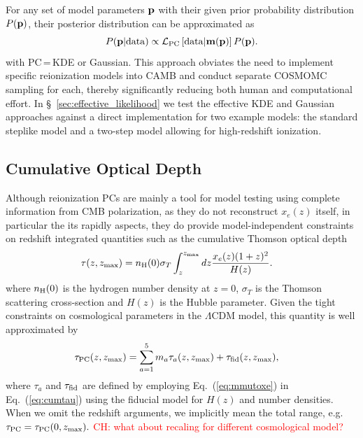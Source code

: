 \documentclass[prd,twocolumn,amsmath,amssymb,floatfix,superscriptaddress,nofootinbib]{revtex4-1}
\newcommand{\ch}[1]{\textcolor{red}{#1}}
\begin{document}
For any set of model parameters ${\bf p}$ with their given prior probability distribution
$P({\bf p})$, their posterior distribution can be approximated as 
\begin{equation}
P({\bf p}| {\rm data}) \propto {\cal L}_{\rm PC}\left[ {\rm data}|\mathbf{m}(\bf p) \right] P(\bf p).
\end{equation}
with PC\,=\,KDE or Gaussian.
This approach obviates the need to implement specific reionization models into CAMB and conduct separate COSMOMC sampling for each, thereby significantly reducing both human and computational effort.
In \S~\ref{sec:effective_likelihood} we test the effective KDE and Gaussian approaches against a direct implementation
for two example models: the standard steplike model and a two-step model allowing for high-redshift ionization.


%
%
%
 
\subsection{Cumulative Optical Depth}
\label{sec:cumulative}

Although reionization PCs are mainly a tool for model testing using complete information from CMB polarization, as they do not reconstruct $x_e(z)$ itself, in particular the its rapidly  aspects, they do provide model-independent constraints on redshift integrated quantities such as  the cumulative Thomson optical depth
\begin{align}
\tau(z,z_{\rm max}) & = n_{\rm H}(0) \sigma_T \int_z^{z_{\rm max}} dz \frac{x_e(z) (1+z)^{2} }{H(z)}.
\label{eq:cumtau}
\end{align}
where $n_{\rm H}(0)$ is the hydrogen number density at $z=0$, $\sigma_T$ is the Thomson scattering cross-section and $H(z)$ is the Hubble parameter. 
Given the tight constraints on cosmological parameters in the $\Lambda$CDM model, this quantity is well approximated by
\begin{align}
\tau_{\rm PC}(z,z_{\rm max})& = \sum_{a=1}^5 m_a \tau_a(z,z_{\rm max}) + \tau_{\rm fid}(z,z_{\rm max}),
\label{eq:cumtauPC}
\end{align}
where $\tau_a$ and $\tau_{\rm fid}$ are defined by employing Eq.~({\ref{eq:mmutoxe}}) in
Eq.~(\ref{eq:cumtau}) using the fiducial model 
for $H(z)$ and number densities.
 When we omit the redshift arguments, we
implicitly mean the total range, e.g. 
 $
 \tau_{\rm PC}=\tau_{\rm PC}(0,z_{\rm max}).
 $
 \ch{CH: what about recaling for different cosmological model?}
 
\end{document}
